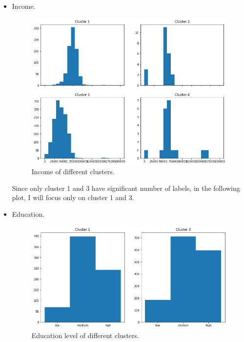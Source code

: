 \documentclass[11pt]{article}
\begin{document}
\newpage

\begin{itemize}
\item Income.

\begin{figure}[h!]
\centerline{\includegraphics[scale=0.4]{clu_conc_1.png}}
\caption{Income of different clusters.}
\end{figure}

Since only cluster 1 and 3 have significant number of labels, in the following plot, I will focus only on cluster 1 and 3.

\item Education.

\begin{figure}[h!]
\centerline{\includegraphics[scale=0.35]{clu_conc_2.png}}
\caption{Education level of different clusters.}
\end{figure}

\newpage


\end{itemize}
\end{document}
